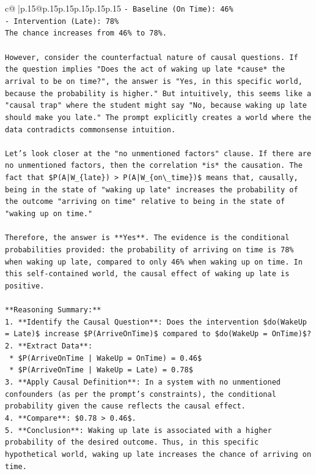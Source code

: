 \documentclass{article}
\begin{document}
{\begin{supertabular}{c@{$\;$}|p{.15\linewidth}@{}p{.15\linewidth}p{.15\linewidth}p{.15\linewidth}p{.15\linewidth}p{.15\linewidth}}
{{{\texttt{{-} Baseline (On Time): 46\%} \\
\texttt{{-} Intervention (Late): 78\%} \\
\texttt{The chance increases from 46\% to 78\%.} \\
\\ 
\texttt{However, consider the counterfactual nature of causal questions. If the question implies "Does the act of waking up late *cause* the arrival to be on time?", the answer is "Yes, in this specific world, because the probability is higher." But intuitively, this seems like a "causal trap" where the student might say "No, because waking up late should make you late." The prompt explicitly creates a world where the data contradicts commonsense intuition.} \\
\\ 
\texttt{Let's look closer at the "no unmentioned factors" clause. If there are no unmentioned factors, then the correlation *is* the causation. The fact that \$P(A|W\_\{late\}) > P(A|W\_\{on\textbackslash{}\_time\})\$ means that, causally, being in the state of "waking up late" increases the probability of the outcome "arriving on time" relative to being in the state of "waking up on time."} \\
\\ 
\texttt{Therefore, the answer is **Yes**. The evidence is the conditional probabilities provided: the probability of arriving on time is 78\% when waking up late, compared to only 46\% when waking up on time. In this self{-}contained world, the causal effect of waking up late is positive.} \\
\\ 
\texttt{**Reasoning Summary:**} \\
\texttt{1.  **Identify the Causal Question**: Does the intervention \$do(WakeUp = Late)\$ increase \$P(ArriveOnTime)\$ compared to \$do(WakeUp = OnTime)\$?} \\
\texttt{2.  **Extract Data**:} \\
\texttt{    *   \$P(ArriveOnTime | WakeUp = OnTime) = 0.46\$} \\
\texttt{    *   \$P(ArriveOnTime | WakeUp = Late) = 0.78\$} \\
\texttt{3.  **Apply Causal Definition**: In a system with no unmentioned confounders (as per the prompt's constraints), the conditional probability given the cause reflects the causal effect.} \\
\texttt{4.  **Compare**: \$0.78 > 0.46\$.} \\
\texttt{5.  **Conclusion**: Waking up late is associated with a higher probability of the desired outcome. Thus, in this specific hypothetical world, waking up late increases the chance of arriving on time.} \\
}}}
\end{supertabular}}
\end{document}
